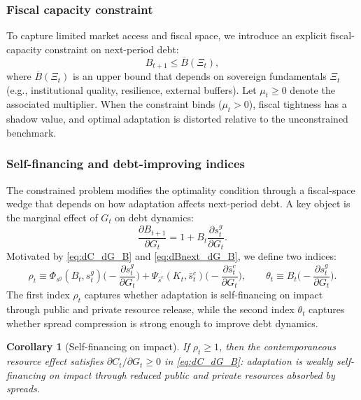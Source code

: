 \documentclass[12pt]{article}
\newtheorem{corollary}[theorem]{Corollary}
\begin{document}
\subsubsection{Fiscal capacity  constraint}
\label{subsec:fiscal_constraint_B}

To capture limited market access and fiscal space, we introduce an explicit fiscal-capacity constraint on next-period debt:
\begin{equation}
  B_{t+1}\le \overline B(\Xi_t),
  \label{eq:debt_limit_B}
\end{equation}
where $\overline B(\Xi_t)$ is an upper bound that depends on sovereign fundamentals $\Xi_t$ (e.g., institutional quality,
resilience, external buffers). Let $\mu_t\ge 0$ denote the associated multiplier. When the constraint binds ($\mu_t>0$),
fiscal tightness has a shadow value, and optimal adaptation is distorted relative to the unconstrained benchmark.

\subsubsection{Self-financing and debt-improving indices}
\label{subsec:sufficient_stats_B}

The constrained problem modifies the optimality condition through a fiscal-space wedge that depends on how adaptation affects
next-period debt. A key object is the marginal effect of $G_t$ on debt dynamics:
\begin{equation}
  \frac{\partial B_{t+1}}{\partial G_t} = 1 + B_t \frac{\partial s^g_t}{\partial G_t}.
  \label{eq:dBnext_dG_B}
\end{equation}
Motivated by \eqref{eq:dC_dG_B} and \eqref{eq:dBnext_dG_B}, we define two indices:
\begin{equation}
  \rho_t \equiv \Phi_{s^g}(B_t,s^g_t)\Big(-\frac{\partial s^g_t}{\partial G_t}\Big)
  +\Psi_{\bar s^c}(K_t,\bar s^c_t)\Big(-\frac{\partial \bar s^c_t}{\partial G_t}\Big),
  \qquad
  \theta_t \equiv B_t\Big(-\frac{\partial s^g_t}{\partial G_t}\Big).
  \label{eq:rho_theta_def_B}
\end{equation}
The first index $\rho_t$ captures whether adaptation is self-financing on impact through public and private resource release,
while the second index $\theta_t$ captures whether spread compression is strong enough to improve debt dynamics.

\begin{corollary}[Self-financing on impact]
\label{cor:self_financing_B}
If $\rho_t\ge 1$, then the contemporaneous resource effect satisfies $\partial C_t/\partial G_t\ge 0$ in \eqref{eq:dC_dG_B}:
adaptation is weakly self-financing on impact through reduced public and private resources absorbed by spreads.
\end{corollary}
\end{document}
